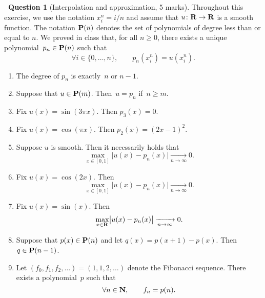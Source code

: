 \documentclass[11pt]{article}
\theoremstyle{definition}
\newtheorem{question}{{\normalfont \faGears}~Question}
\begin{document}
\newpage
\begin{question}
    [Interpolation and approximation, 5 marks]
    Throughout this exercise, we use the notation
    $x^n_i = i/n$ and assume that $u \colon \mathbf R \to \mathbf R$ is a smooth function.
    The notation $\mathbf P(n)$ denotes the set of polynomials of degree less than or equal to $n$.
    We proved in class that,
    for all $n \geq 0$,
    there exists a unique polynomial~$p_n \in \mathbf P(n)$ such that
    \begin{equation}
        \label{eq:interpolation}
        \forall i \in \{0, \dotsc, n\}, \qquad
        p_n(x^n_i) = u (x^n_i).
    \end{equation}
    \begin{enumerate}
        \item
            The degree of $p_n$ is exactly~$n$ or $n - 1$.

        \item
            Suppose that $u \in \mathbf P(m)$.
            Then~$u = p_n$ if~$n \geq m$.

        \item
            Fix $u(x) = \sin(3\pi x)$. Then $p_3(x) = 0$.

        \item
            Fix $u(x) = \cos(\pi x)$.
            Then $p_2(x) = (2x - 1)^2$.

        \item
            Suppose $u$ is smooth.
            Then it necessarily holds that
            \[
                \max_{x \in [0, 1]} \bigl\lvert u(x) - p_n(x) \bigr\rvert \xrightarrow[n \to \infty]{} 0.
            \]

        \item
            Fix $u(x) = \cos(2x)$.
            Then
            \[
                \max_{x \in [0, 1]} \bigl\lvert u(x) - p_n(x) \bigr\rvert \xrightarrow[n \to \infty]{} 0.
            \]

        \item
            Fix $u(x) = \sin(x)$.
            Then
            \[
                \max_{x \in \mathbf R} \bigl\lvert u(x) - p_n(x) \bigr\rvert \xrightarrow[n \to \infty]{} 0.
            \]

        \item
            Suppose that $p(x) \in \mathbf P(n)$ and let $q(x) = p(x+1) - p(x)$. Then $q \in \mathbf P(n-1)$.

        \item
            Let $(f_0, f_1, f_2, \dotsc) = (1, 1, 2, \dotsc)$ denote the Fibonacci sequence.
            There exists a polynomial~$p$ such that
            \begin{equation*}
                \label{eq:fibonacci_polynomial}
                \forall n \in \mathbf N, \qquad
                f_n = p(n).
            \end{equation*}


\end{enumerate}
\end{question}
\end{document}
